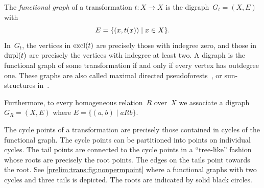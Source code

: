 \label{def:GR} 
\label{def:Gf}
The \emph{functional graph} of a transformation $t\colon X \to X$
is the digraph~$G_t = (X, E)$ with 
\[
E = \{ (x, \applyfunc{x}{t}) \mid x \in X\}.
\]
In~$G_t$, the vertices in $\excl{t}$ are precisely those with indegree zero, and those in $\dupl{t}$ are precisely 
the vertices with indegree at least two. 
A digraph is the functional graph of some transformation
if and only if every vertex has outdegree one. 
These graphs are also called
maximal directed pseudoforests~\cite{GABOW1988259},
or sun-structures in~\cite{FernauGHHVW19}.

Furthermore, to every homogeneous relation~$R$ over~$X$
we associate a digraph 
$G_R = (X, E)$ where $E = \{ ( a, b ) \mid aRb \}$.

\begin{remark} \label{prelim:rem:intuition-functional-graph}
	The cycle points of a transformation are precisely those contained
	in cycles of the functional graph.
	The cycle points can be partitioned into points on individual cycles. The tail points
	are connected to the cycle points in a ``tree-like'' fashion 
	whose roots are precisely the root points.
	The edges on the tails point towards the root.
	See \cref{prelim:trans:fig:nonpermpoint} 
	where a functional graphs
	with two cycles and three tails is depicted.
	The roots are indicated by solid black circles.
		
	\begin{figure}[ht]
		\centering
\end{figure}
\end{remark}
